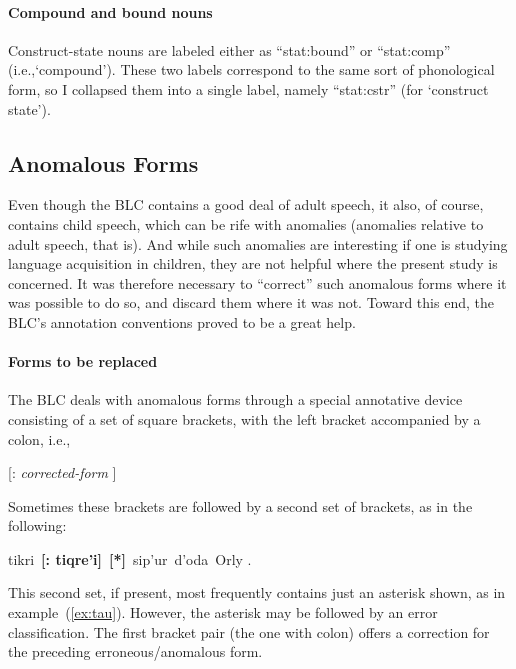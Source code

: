 \paragraph{Compound and bound nouns}
Construct-state nouns are labeled either as ``\textsf{stat:bound}'' 
or ``\textsf{stat:comp}'' (i.e.,`compound'). 
These two labels correspond to the same sort of phonological form, 
 so I collapsed them into a single label, namely 
``\textsf{stat:cstr}'' (for `construct state').

\subsection{Anomalous Forms}\label{sec:anomolous}

Even though the BLC contains a good deal of adult speech, it also, 
of course, contains child speech, which  
can be rife with anomalies (anomalies relative to adult speech, that is). 
And while such anomalies are interesting if one is studying language acquisition 
in children, they are not helpful where the present study is concerned. It 
was therefore necessary to ``correct'' such anomalous forms where it was 
possible to do so, and discard them where it was not. Toward this end, 
the BLC's annotation conventions proved to be a great help.

\paragraph{Forms to be replaced}
The BLC deals with anomalous forms through a special 
annotative device consisting of a set of square brackets, with the left bracket 
accompanied
by a colon, i.e., 
\begin{center}
\textsf{[: \textit{corrected-form} ]}
\end{center}
Sometimes these brackets 
are followed by a second set of brackets, as in the following:
\begin{exe} \label{ex:tau}
\ex \textsf{tikri \,\textbf{[: tiqre\a'{i}]}\, \textbf{[*]}\, sip\a'{u}r\, d\a'{o}da\, Orly .}
\end{exe}
This second set, if present, most frequently contains just an asterisk shown, as in example~(\ref{ex:tau}). However,
the asterisk may be followed
by an error classification. The first bracket pair (the one with colon) offers a correction for the preceding erroneous/anomalous form.


